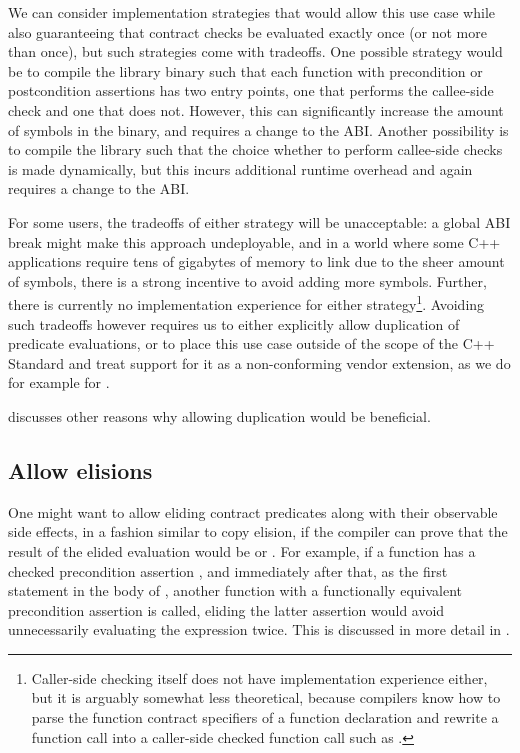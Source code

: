 We can consider implementation strategies that would allow this use case while also guaranteeing that contract checks be evaluated exactly once (or not more than once), but such strategies come with tradeoffs. One possible strategy would be to compile the library binary such that each function with precondition or postcondition assertions has two entry points, one that performs the callee-side check and one that does not. However, this can significantly increase the amount of symbols in the binary, and requires a change to the ABI. Another possibility is to compile the library such that the choice whether to perform callee-side checks is made dynamically, but this incurs additional runtime overhead and again requires a change to the ABI.

For some users, the tradeoffs of either strategy will be unacceptable: a global ABI break might make this approach undeployable, and in a world where some C++ applications require tens of gigabytes of memory to link due to the sheer amount of symbols, there is a strong incentive to avoid adding more symbols. Further, there is currently no implementation experience for either strategy\footnote{Caller-side checking itself does not have implementation experience either, but it is arguably somewhat less theoretical, because compilers know how to parse the function contract specifiers of a function declaration and rewrite a function call  into a caller-side checked function call such as \mbox{}.}. Avoiding such tradeoffs however requires us to either explicitly allow duplication of predicate evaluations, or to place this use case outside of the scope of the C++ Standard and treat support for it as a non-conforming vendor extension, as we do for example for .

\cite{P2751R1} discusses other reasons why allowing duplication would be beneficial.

\subsection{Allow elisions}
\label{subsec:elisions}

One might want to allow eliding contract predicates along with their observable side effects, in a fashion similar to copy elision, if the compiler can prove that the result of the elided evaluation would be  or . For example, if a function  has a checked precondition assertion , and immediately after that, as the first statement in the body of , another function  with a functionally equivalent precondition assertion is called, eliding the latter assertion would avoid unnecessarily evaluating the expression  twice. This is discussed in more detail in \cite{P2751R1}.

